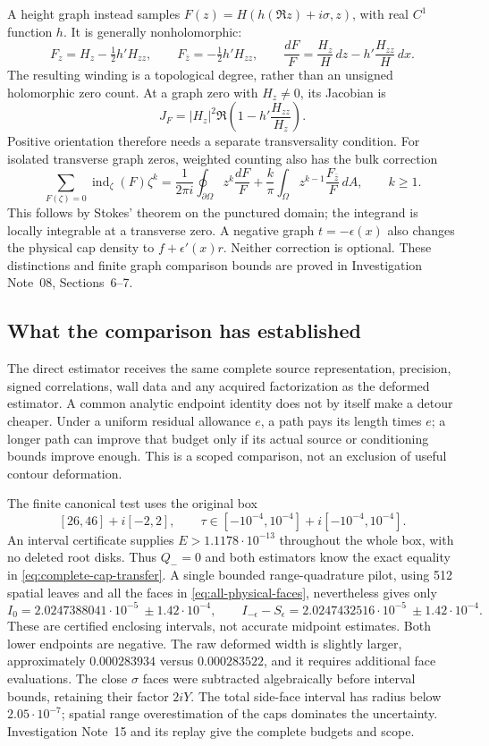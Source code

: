 A height graph instead samples
$F(z)=H(h(\Re z)+i\sigma,z)$, with real $C^1$ function $h$.  It is generally
nonholomorphic:
\begin{equation}
 F_z=H_z-\tfrac12h'H_{zz},\qquad
 F_{\bar z}=-\tfrac12h'H_{zz},\qquad
 \frac{dF}{F}=\frac{H_z}{H}\,dz-h'\frac{H_{zz}}H\,dx.
 \label{eq:height-graph-corrections}
\end{equation}
The resulting winding is a topological degree, rather than an unsigned
holomorphic zero count.  At a graph zero with $H_z\ne0$, its Jacobian is
\[
 J_F=|H_z|^2\Re\!\left(1-h'\frac{H_{zz}}{H_z}\right).
\]
Positive orientation therefore needs a separate transversality condition.
For isolated transverse graph zeros, weighted counting also has the bulk
correction
\[
 \sum_{F(\zeta)=0}\operatorname{ind}_\zeta(F)\zeta^k
 =\frac1{2\pi i}\oint_{\partial\Omega}z^k\frac{dF}{F}
 +\frac{k}{\pi}\int_\Omega z^{k-1}\frac{F_{\bar z}}F\,dA,
 \qquad k\ge1.
\]
This follows by Stokes' theorem on the punctured domain; the integrand is
locally integrable at a transverse zero.  A negative graph $t=-\epsilon(x)$
also changes the physical cap density to $f+\epsilon'(x)r$.
Neither correction is optional.  These distinctions and finite graph
comparison bounds are proved in Investigation Note~08, Sections~6--7.

\subsection{What the comparison has established}

The direct estimator receives the same complete source representation,
precision, signed correlations, wall data and any acquired factorization as
the deformed estimator.  A common analytic endpoint identity does not by
itself make a detour cheaper.  Under a uniform residual allowance $e$, a
path pays its length times $e$; a longer path can improve that budget only
if its actual source or conditioning bounds improve enough.  This is a
scoped comparison, not an exclusion of useful contour deformation.

The finite canonical test uses the original box
\[
 [26,46]+i[-2,2],\qquad
 \tau\in[-10^{-4},10^{-4}]+i[-10^{-4},10^{-4}].
\]
An interval certificate supplies $E>1.1178\cdot10^{-13}$ throughout the
whole box, with no deleted root disks.  Thus $Q_-=0$ and both estimators
know the exact equality in \eqref{eq:complete-cap-transfer}.  A single
bounded range-quadrature pilot, using 512 spatial leaves and all the faces
in \eqref{eq:all-physical-faces}, nevertheless gives only
\[
 I_0=2.0247388041\cdot10^{-5}\ \pm1.42\cdot10^{-4},\qquad
 I_{-\epsilon}-S_\epsilon
 =2.0247432516\cdot10^{-5}\ \pm1.42\cdot10^{-4}.
\]
These are certified enclosing intervals, not accurate midpoint estimates.
Both lower endpoints are negative.  The raw deformed width is slightly
larger, approximately $0.000283934$ versus $0.000283522$, and it requires
additional face evaluations.  The close $\sigma$ faces were subtracted
algebraically before interval bounds, retaining their factor $2iY$.
The total side-face interval has radius below $2.05\cdot10^{-7}$;
spatial range overestimation of the caps dominates the uncertainty.
Investigation Note~15 and its replay give the complete budgets and scope.

